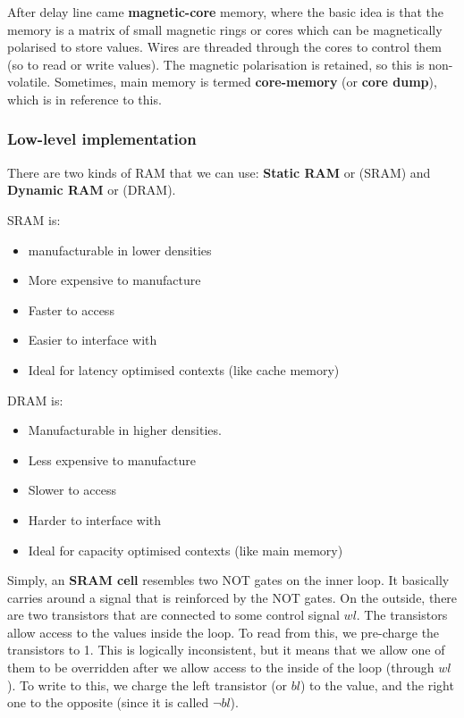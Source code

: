 \documentclass[11pt,a4paper,titlepage,dvipsnames,cmyk]{scrartcl}
\begin{document}
After delay line came \textbf{magnetic-core} memory, where the basic idea
is that the memory is a matrix of small magnetic rings or cores which can
be magnetically polarised to store values. Wires are threaded through the
cores to control them (so to read or write values). The magnetic
polarisation is retained, so this is non-volatile. Sometimes, main memory
is termed \textbf{core-memory} (or \textbf{core dump}), which is in
reference to this.

\subsubsection{Low-level implementation}%
\label{ssub:Low-level implementation}

There are two kinds of RAM that we can use: \textbf{Static RAM} or (SRAM)
and \textbf{Dynamic RAM} or (DRAM).

SRAM is:
\begin{itemize}
    \item manufacturable in lower densities 
    \item More expensive to manufacture
    \item Faster to access
    \item Easier to interface with
    \item Ideal for latency optimised contexts (like cache memory)
\end{itemize}

DRAM is:
\begin{itemize}
    \item Manufacturable in higher densities.
    \item Less expensive to manufacture
    \item Slower to access
    \item Harder to interface with
    \item Ideal for capacity optimised contexts (like main memory)
\end{itemize}

Simply, an \textbf{SRAM cell} resembles two NOT gates on the inner loop.
It basically carries around a signal that is reinforced by the NOT gates.
On the outside, there are two transistors that are connected to some
control signal $wl$. The transistors allow access to the values inside the
loop. To read from this, we pre-charge the transistors to 1. This is
logically inconsistent, but it means that we allow one of them to be
overridden after we allow access to the inside of the loop (through $wl$).
To write to this, we charge the left transistor (or $bl$) to the value,
and the right one to the opposite (since it is called $\neg bl$).
\end{document}
